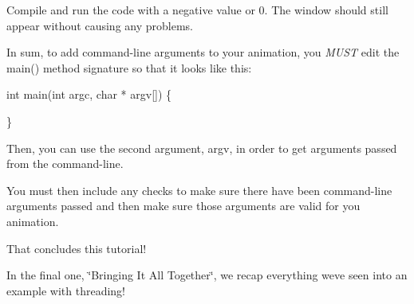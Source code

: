 Compile and run the code with a negative value or 0. The window should still appear without causing any problems.

In sum, to add command-\/line arguments to your animation, you {\itshape M\+U\+S\+T} edit the main() method signature so that it looks like this\+:


\begin{DoxyCode}
\textcolor{keywordtype}{int} main(\textcolor{keywordtype}{int} argc, \textcolor{keywordtype}{char} * argv[]) \{

\}
\end{DoxyCode}


Then, you can use the second argument, {\ttfamily argv}, in order to get arguments passed from the command-\/line.

You must then include any checks to make sure there have been command-\/line arguments passed and then make sure those arguments are valid for you animation.

That concludes this tutorial!

In the final one, \char`\"{}\+Bringing It All Together\char`\"{}, we recap everything we\textquotesingle{}ve seen into an example with threading! 